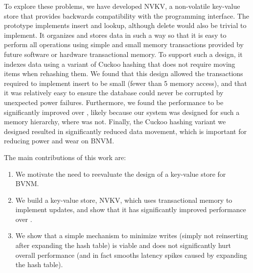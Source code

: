To explore these problems, we have developed NVKV, a non-volatile key-value
store that provides backwards compatibility with the \bdb programming interface.
The prototype implements insert and lookup, although delete would also be trivial
to implement. It organizes and stores data in such a way so that it is easy to
perform all operations using simple and small memory transactions provided by
future software or hardware transactional memory. To support such a design, it
indexes data using a variant of Cuckoo hashing that does not require moving
items when rehashing them. We found that this design allowed the transactions
required to implement insert to be small (fewer than 5 memory access), and that
it was relatively easy to ensure the database could never be corrupted by
unexpected power failures. Furthermore, we found the performance to be
significantly improved over \bdb, likely because our system was designed for
such a memory hierarchy, where \bdb was not. Finally, the Cuckoo hashing variant
we designed resulted in significantly reduced data movement, which is important
for reducing power and wear on BNVM.

The main contributions of this work are:

\begin{enumerate}

\item We motivate the need to reevaluate the design of a key-value store for
BVNM.
\item We build a key-value store, NVKV, which uses transactional
memory to implement updates, and show that it has significantly improved
performance over \bdb.
\item We show that a simple mechanism to minimize writes (simply not reinserting
after expanding the hash table) is viable and does not significantly hurt
overall performance (and in fact smooths latency spikes caused by expanding the
hash table).
\end{enumerate}

